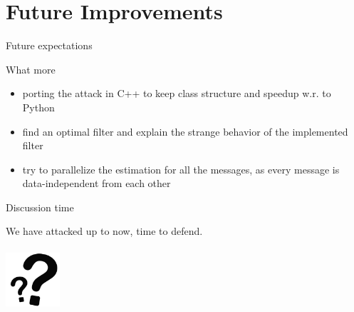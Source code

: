 \documentclass[aspectratio=43]{beamer}
\begin{document}
\section{Future Improvements}
\begin{frame}{Future expectations}
  \begin{block}{What more}
    \begin{itemize}
      \pause \item porting the attack in C++ to keep class structure and speedup w.r. to Python
      \pause \item find an optimal filter and explain the strange behavior of the implemented filter
      \pause \item try to parallelize the estimation for all the messages, as every message is data-independent from each other
    \end{itemize}
  \end{block}
\end{frame}

\begin{frame}[c]{Discussion time}
  \begin{center}
    We have attacked up to now, time to defend.\\
    \Huge{\color{red}{Questions?}}\\
    \vfill
    \hfill
    \includegraphics[height=2cm]{./graphics/qm}
  \end{center}
\end{frame}
\end{document}
